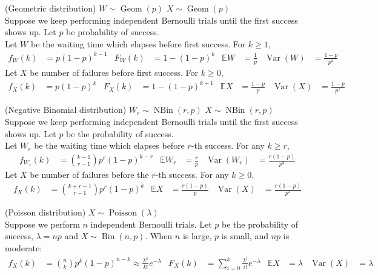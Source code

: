 \documentclass{huhtakm-template-book}
\newcommand{\expect}{\mathbb{E}}
\DeclareMathOperator{\Bin}{Bin}
\DeclareMathOperator{\NBin}{NBin}
\DeclareMathOperator{\Geom}{Geom}
\DeclareMathOperator{\Poisson}{Poisson}
\DeclareMathOperator{\Var}{Var}
\begin{document}
\begin{seg}(Geometric distribution) $W\sim\Geom(p)$ $X\sim\Geom(p)$\\
    Suppose we keep performing independent Bernoulli trials until the first success shows up. Let $p$ be probability of success.\\
    Let $W$ be the waiting time which elapses before first success. For $k\geq 1$,
    \begin{align*}
        f_{W}(k)&=p(1-p)^{k-1} & F_{W}(k)&=1-(1-p)^{k} & \expect W&=\frac{1}{p} & \Var(W)&=\frac{1-p}{p^{2}}
    \end{align*}
    Let $X$ be number of failures before first success. For $k\geq 0$,
    \begin{align*}
        f_{X}(k)&=p(1-p)^{k} & F_{X}(k)&=1-(1-p)^{k+1} & \expect X&=\frac{1-p}{p} & \Var(X)&=\frac{1-p}{p^{2}}
    \end{align*}
\end{seg}
\begin{seg}(Negative Binomial distribution) $W_{r}\sim\NBin(r,p)$ $X\sim\NBin(r,p)$\\
    Suppose we keep performing independent Bernoulli trials until the first success shows up. Let $p$ be the probability of success.\\
    Let $W_{r}$ be the waiting time which elapses before $r$-th success. For any $k\geq r$,
    \begin{align*}
        f_{W_{r}}(k)&=\binom{k-1}{r-1}p^{r}(1-p)^{k-r} & \expect W_{r}&=\frac{r}{p} & \Var(W_{r})&=\frac{r(1-p)}{p^{2}}
    \end{align*}
    Let $X$ be number of failures before the $r$-th success. For any $k\geq 0$,
    \begin{align*}
        f_{X}(k)&=\binom{k+r-1}{r-1}p^{r}(1-p)^{k} & \expect X&=\frac{r(1-p)}{p} & \Var(X)&=\frac{r(1-p)}{p^{2}}
    \end{align*}
\end{seg}
\begin{seg}(Poisson distribution) $X\sim\Poisson(\lambda)$\\
    Suppose we perform $n$ independent Bernoulli trials. Let $p$ be the probability of success, $\lambda=np$ and $X\sim\Bin(n,p)$. When $n$ is large, $p$ is small, and $np$ is moderate:
    \begin{align*}
        f_{X}(k)&=\binom{n}{k}p^{k}(1-p)^{n-k}\approx\frac{\lambda^{k}}{k!}e^{-\lambda} & F_{X}(k)&=\sum_{i=0}^{k}\frac{\lambda^{i}}{i!}e^{-\lambda} & \expect X&=\lambda & \Var(X)&=\lambda
    \end{align*}
\end{seg}
\end{document}
